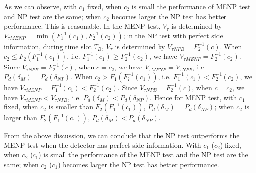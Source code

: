 As we can observe, with $c_1$  fixed, when $c_2$ is small the performance of MENP test and NP test are the same; when $c_2$ becomes larger the NP test has better performance. This is reasonable. In the MENP test, $V_\tau$ is determined by $V_{\tau MENP}= \min (F_1^{-1}(c_1), F_2^{-1}(c_2))$; in the NP test with perfect side information, during time slot $T_B$, $V_\tau$ is determined by $V_{\tau NP B} = F_2^{-1}(c)$. When $c_2 \leq F_2(F_1^{-1}(c_1))$, i.e. $F_1^{-1}(c_1) \geq  F_2^{-1}(c_2)$, we have  $V_{\tau MENP} = F_2^{-1}(c_2)$. Since $V_{\tau NP B} = F_2^{-1}(c)$, when $c = c_2$, we have $V_{\tau MENP} = V_{\tau NP B}$, i.e. $P_d(\delta_M) = P_d(\delta_{NP})$.    
When $c_2 > F_1(F_2^{-1}(c_1))$, i.e. $F_1^{-1}(c_1) < F_2^{-1}(c_2)$, we have  $V_{\tau MENP} = F_1^{-1}(c_1) < F_2^{-1}(c_2)$. Since $V_{\tau NP B} = F_2^{-1}(c)$, when $c = c_2$, we have  $V_{\tau MENP} < V_{\tau NP B}$, i.e.  $P_d(\delta_M) < P_d(\delta_{NP})$.
Hence for MENP test, with $c_1$ fixed, when $c_2$ is smaller than $ F_2( F_1^{-1}(c_1)) $, $P_d(\delta_M) = P_d(\delta_{NP})$; when $c_2$ is larger than $ F_2( F_1^{-1}(c_1)) $, $P_d(\delta_M) < P_d(\delta_{NP})$. 

From the above discussion, we can conclude that the NP test outperforms the MENP test when the detector has perfect side information. With $c_1$ ($c_2$) fixed, when $c_2$ ($c_1$) is small the performance of the  MENP test and the NP test are the same; when $c_2$ ($c_1$) becomes larger the NP test has better performance.  
